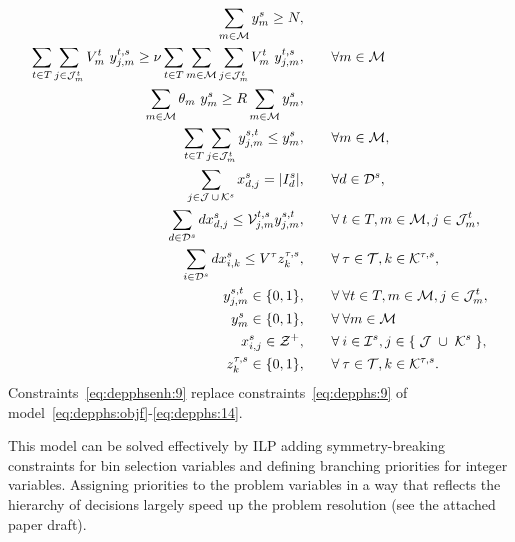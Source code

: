 \documentclass[a4paper,11pt]{article}
\begin{document}
	\begin{alignat}{2}
		\sum\limits_{m \in \cal {M}} y^s_{m}\geq{N}, & \qquad
		\label{eq:depphsenh:3}\\
		\sum\limits_{t \in T} \sum\limits_{j \in {\cal J}^t_{m}} V_{m}^{t} \ y^{t,s}_{j,m} \geq \nu \sum\limits_{t \in T} \sum\limits_{m \in {\cal M}} \sum\limits_{j \in {\cal J}^t_{m}} V_{m}^{t} \ y^{t,s}_{j,m}, & \qquad \forall m \in {\cal M}
		\label{eq:depphsenh:3.2}\\
		\sum\limits_{m \in {\cal M}} \theta_{m} \ y^s_{m} \geq R \sum\limits_{m \in {\cal M}} y^s_{m}, & \qquad \label{eq:depphsenh:4}\\
		\sum\limits_{t \in T} \sum\limits_{j \in {\cal J}^t_{m}} y^{s,t}_{j,m} \leq y^s_{m}, & \qquad \forall m \in \cal M, \label{eq:depphsenh:5}\\
		\sum\limits_{j \in {\cal J} \, \cup \, {\cal K}^{s} }x_{d,j}^{s}  = | I^s_d|, & \qquad \forall d \in {\cal D}^{s}, \label{eq:depphsenh:9}\\
		\sum\limits_{d \in {\cal D}^{s}} d x_{d,j}^{s} \leq {\cal V}_{j,m}^{t,s} y^{s,t}_{j,m}, & \qquad \forall \: t \in T, m\in{{\cal M}}, j \in {\cal J}^t_{m}, \label{eq:depphsenh:10}\\
		\sum\limits_{i \in {\cal D}^{s}} d x_{i,k}^{s} \leq V^{\tau} z_k^{\tau,s}, & \qquad \forall \: \tau \in {\cal T}, k \in {\cal K}^{\tau,s}, \label{eq:depphsenh:11}\\
		y^{s,t}_{j,m} \in \{0, 1\}, & \qquad \forall \: \forall t \in T, m \in {\cal M}, j \in {\cal J}^t_{m}, \label{eq:depphsenh:6}\\
		y^s_{m} \in \{0, 1\}, & \qquad \forall \: \forall m \in \cal M \label{eq:depphsenh:7}\\
		x_{i,j}^{s} \in {\cal Z}^+, & \qquad \forall \: i \in {\cal I}^{s}, j \in \{ \; {\cal J} \; \cup \; {\cal K}^{s} \; \} , \label{eq:depphsenh:12}\\
		z_k^{\tau,s} \in \{0, 1\}, & \qquad \forall \: \tau \in {\cal T} , k \in {\cal K}^{\tau,s}. \label{eq:depphsenh:14}
	\end{alignat}
	Constraints~\eqref{eq:depphsenh:9} replace constraints~\eqref{eq:depphs:9} of model~\eqref{eq:depphs:objf}-\eqref{eq:depphs:14}.
	
	This model can be solved effectively by ILP adding symmetry-breaking constraints for bin selection variables and defining branching priorities for integer variables.
	Assigning priorities to the problem variables in a way that reflects the hierarchy of decisions largely speed up the problem resolution (see the attached paper draft).
	
\end{document}
